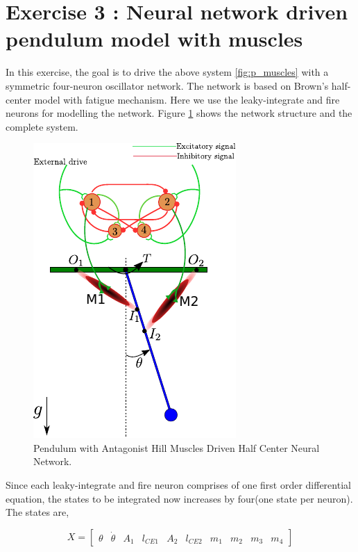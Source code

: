 \documentclass{cmc}
\begin{document}
\newpage
\section*{Exercise 3 : Neural network driven pendulum model with
  muscles}
\label{sec:neur-netw-driv}

In this exercise, the goal is to drive the above system
\ref{fig:p_muscles} with a symmetric four-neuron oscillator
network. The network is based on Brown's half-center model with
fatigue mechanism. Here we use the leaky-integrate and fire neurons
for modelling the network. Figure \ref{fig:p_muscles_neurons} shows
the network structure and the complete system.

\begin{figure}[H]
  \centering
  \includegraphics[scale=1.5]{figures/pendulum_muscles_neurons.pdf}
  \caption{Pendulum with Antagonist Hill Muscles Driven Half Center
    Neural Network.}
  \label{fig:p_muscles_neurons}
\end{figure}

Since each leaky-integrate and fire neuron comprises of one first
order differential equation, the states to be integrated now increases
by four(one state per neuron). The states are,


\begin{equation}
  \label{eq:1}
  X = \begin{bmatrix}
    \theta & \dot{\theta} & A_1 & l_{CE1} & A_2 & l_{CE2} & m_1 & m_2 & m_3 & m_4
  \end{bmatrix}
\end{equation}
\end{document}
